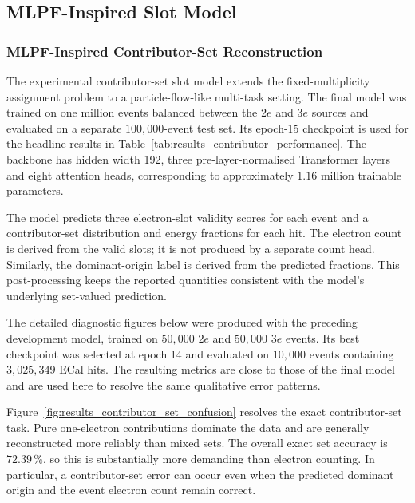 \clearpage
\subsection{MLPF-Inspired Slot Model}

\subsubsection{MLPF-Inspired Contributor-Set Reconstruction}

The experimental contributor-set slot model extends the fixed-multiplicity
assignment problem to a particle-flow-like multi-task setting. The final model
was trained on one million events balanced between the \(2e\) and \(3e\)
sources and evaluated on a separate \(100{,}000\)-event test set. Its
epoch-15 checkpoint is used for the headline results in
Table~\ref{tab:results_contributor_performance}. The backbone has hidden width
192, three pre-layer-normalised Transformer layers and eight attention heads,
corresponding to approximately \(1.16\) million trainable parameters.

The model predicts three electron-slot validity scores for each event and a
contributor-set distribution and energy fractions for each hit. The electron
count is derived from the valid slots; it is not produced by a separate count
head. Similarly, the dominant-origin label is derived from the predicted
fractions. This post-processing keeps the reported quantities consistent with
the model's underlying set-valued prediction.



The detailed diagnostic figures below were produced with the preceding
development model, trained on \(50{,}000\) \(2e\) and \(50{,}000\) \(3e\)
events. Its best checkpoint was selected at epoch 14 and evaluated on
\(10{,}000\) events containing \(3{,}025{,}349\) ECal hits. The resulting
metrics are close to those of the final model and are used here to resolve the
same qualitative error patterns.

Figure~\ref{fig:results_contributor_set_confusion} resolves the exact
contributor-set task. Pure one-electron contributions dominate the data and
are generally reconstructed more reliably than mixed sets. The overall exact
set accuracy is \(72.39\,\%\), so this is substantially more demanding than
electron counting. In particular, a contributor-set error can occur even when
the predicted dominant origin and the event electron count remain correct.

